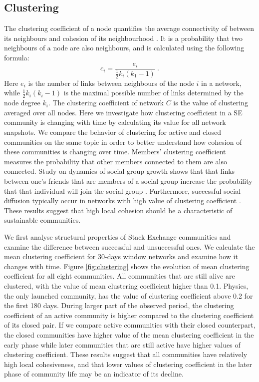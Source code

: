 \subsection{Clustering}
The clustering coefficient of a node quantifies the average connectivity of between its neighbours and cohesion of its neighbourhood \cite{boccaletti2006complex}. It is a probability that two neighbours of a node are also neighbours, and is calculated using the following formula:
\begin{equation}
	c_{i}=\frac{e_{i}}{\frac{1}{2}k_{i}(k_{1}-1)} \ .
	\label{eq:clust}
\end{equation}
Here $e_{i}$ is the number of links between neighbours of the node $i$ in a network, while $\frac{1}{2}k_{i}(k_{i}-1)$ is the maximal possible number of links determined by the node degree $k_{i}$. The clustering coefficient of network $C$ is the value of clustering averaged over all nodes. Here we investigate how clustering coefficient in a SE community is changing with time by calculating its value for all network snapshots. We compare the behavior of clustering for active and closed communities on the same topic in order to better understand how cohesion of these communities is changing over time. 
Members' clustering coefficient measures the probability that other members connected to them are also connected. Study on dynamics of social group growth shows that that links between one's friends that are members of a social group increase the probability that that individual will join the social group \cite{backstrom2006group}. Furthermore, successful social diffusion  typically occur in networks with high value of clustering coefficient \cite{centola2007cascade}. These results suggest that high local cohesion should be a characteristic of sustainable communities.

We first analyse structural properties of Stack Exchange communities and examine the difference between successful and unsuccessful ones. We calculate the mean clustering coefficient for 30-days window networks and examine how it changes with time. Figure \ref{fig:clustering} shows the evolution of mean clustering coefficient for all eight communities. All communities that are still alive are clustered, with the value of mean clustering coefficient higher than 0.1. Physics, the only launched community, has the value of clustering coefficient above 0.2 for the first 180 days.
During larger part of the observed period, the clustering coefficient of an active community is higher compared to the clustering coefficient of its closed pair. If we compare active communities with their closed counterpart, the closed communities have higher value of the mean clustering coefficient in the early phase while later communities that are still active have higher values of clustering coefficient. These results suggest that all communities have relatively high local cohesiveness, and that lower values of clustering coefficient in the later phase of community life may be an indicator of its decline. 

